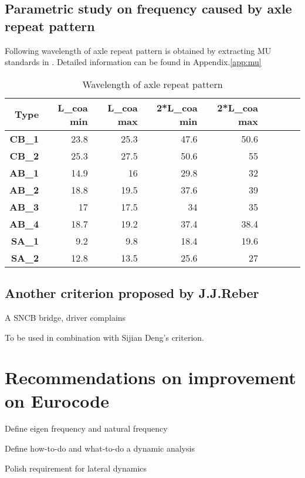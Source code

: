 \section{Parametric study on frequency caused by axle repeat pattern}

Following wavelength of axle repeat pattern is obtained by extracting MU standards in \cite{EC15528}. Detailed information can be found in Appendix.\ref{app:mu}
\begin{table}[h!]
  \centering
  \caption{Wavelength of axle repeat pattern}
    \begin{tabular}{rrrrrrrrr}
    \toprule
    \textbf{Type} & \textbf{L\_coa min} & \textbf{L\_coa max} & \textbf{2*L\_coa min } & \textbf{2*L\_coa max} \\
    \midrule
    \textbf{CB\_1} & 23.8  & 25.3  & 47.6  & 50.6 \\
    \textbf{CB\_2} & 25.3  & 27.5  & 50.6  & 55    \\
    \textbf{AB\_1} & 14.9  & 16    & 29.8  & 32     \\
    \textbf{AB\_2} & 18.8  & 19.5  & 37.6  & 39    \\
    \textbf{AB\_3} & 17    & 17.5  & 34    & 35   \\
    \textbf{AB\_4} & 18.7  & 19.2  & 37.4  & 38.4  \\
    \textbf{SA\_1} & 9.2   & 9.8   & 18.4  & 19.6  \\
    \textbf{SA\_2} & 12.8  & 13.5  & 25.6  & 27    \\
    \bottomrule
    \end{tabular}%
  \label{tab:wavelengthaxlerepeat}%
\end{table}%



\section{Another criterion proposed by J.J.Reber}
A SNCB bridge, driver complains 

To be used in combination with Sijian Deng's criterion.





\chapter{Recommendations on improvement on Eurocode}

Define eigen frequency and natural frequency

Define how-to-do and what-to-do a dynamic analysis

Polish requirement for lateral dynamics